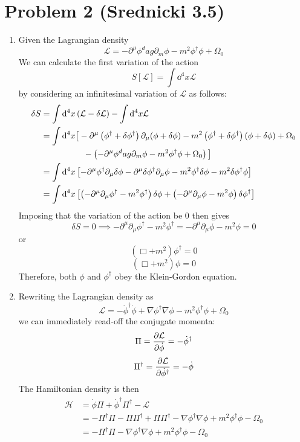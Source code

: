 \documentclass[12pt]{article}
\begin{document}
\section*{Problem 2 \small{(Srednicki 3.5)}}
\begin{enumerate}[label=(\alph*)]
    \item Given the Lagrangian density
    \[ \mathcal{L} = -\partial^\mu\phi^dag\partial_m\phi - m^2\phi^\dag\phi + \Omega_0 \]
    We can calculate the first variation of the action
    \[ S[\mathcal{L}] = \int\dd^4x\mathcal{L} \]
    by considering an infinitesimal variation of $\mathcal{L}$ as follows:
    \begin{align*}
        \delta S &= \int\dd^4x\left(\mathcal{L} - \delta\mathcal{L}\right) - \int\dd^4x\mathcal{L} \\
        &= \int\dd^4x \big{[} -\partial^\mu\left(\phi^\dag + \delta\phi^\dag\right)\partial_\mu(\phi + \delta\phi) - m^2\left(\phi^\dag + \delta\phi^\dag\right)\left(\phi + \delta\phi\right) + \Omega_0 \\
        &\qquad\qquad\quad - \left(-\partial^\mu\phi^dag\partial_m\phi - m^2\phi^\dag\phi + \Omega_0\right) \big{]} \\
        &= \int\dd^4x \left[-\partial^\mu\phi^\dag\partial_\mu\delta\phi - \partial^\mu\delta\phi^\dag\partial_\mu\phi - m^2\phi^\dag\delta\phi - m^2\delta\phi^\dag\phi\right] \\
        &= \int\dd^4x \left[\left(-\partial^\mu\partial_\mu\phi^\dag - m^2\phi^\dag\right)\delta\phi + \left(-\partial^\mu\partial_\mu\phi - m^2\phi\right)\delta\phi^\dag\right]
    \end{align*}
    Imposing that the variation of the action be 0 then gives
    \[ \delta S = 0 \implies -\partial^\mu\partial_\mu\phi^\dag - m^2\phi^\dag = -\partial^\mu\partial_\mu\phi - m^2\phi = 0 \]
    or
    \[ (\Box + m^2)\phi^\dag = 0 \]
    \[ (\Box + m^2)\phi = 0 \]
    Therefore, both $\phi$ and $\phi^\dag$ obey the Klein-Gordon equation.

    \item Rewriting the Lagrangian density as
    \[ \mathcal{L} = -\dot{\phi}^\dag\dot{\phi} + \nabla\phi^\dag\nabla\phi - m^2\phi^\dag\phi + \Omega_0 \]
    we can immediately read-off the conjugate momenta:
    \[ \Pi = \pdv{\mathcal{L}}{\dot{\phi}} = -\dot{\phi}^\dag \]
    \[ \Pi^\dag = \pdv{\mathcal{L}}{\dot{\phi}^\dag} = -\dot{\phi} \]
    The Hamiltonian density is then
    \begin{align*}
        \mathcal{H} &= \dot{\phi}\Pi + \dot{\phi}^\dag\Pi^\dag - \mathcal{L} \\
        &= -\Pi^\dag\Pi - \Pi\Pi^\dag + \Pi\Pi^\dag - \nabla\phi^\dag\nabla\phi + m^2\phi^\dag\phi - \Omega_0 \\
        &= \boxed{-\Pi^\dag\Pi - \nabla\phi^\dag\nabla\phi + m^2\phi^\dag\phi - \Omega_0}
    \end{align*}


\end{enumerate}
\end{document}
